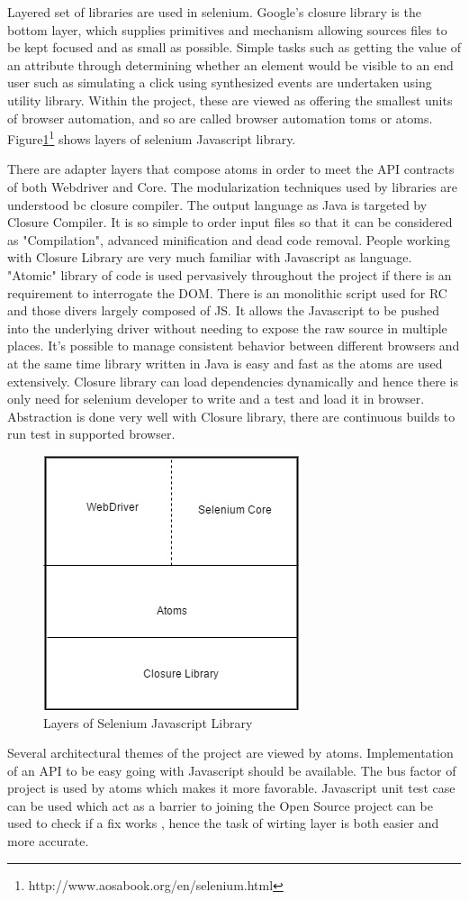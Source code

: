 \documentclass[article,type=msc,colorback,accentcolor=tud9c,twoside,11pt]{tudthesis}
\begin{document}
Layered set of libraries are used in selenium. Google's closure library is the bottom layer, which supplies primitives and mechanism allowing sources files to be kept focused and as small as possible. Simple tasks such as getting the value of an attribute through determining whether an element would be visible to an end user such as simulating a click using synthesized events are undertaken using utility library. Within the project, these are viewed as offering the smallest units of browser automation, and so are called browser automation toms or atoms. 
 Figure\ref{fig:LayersofSeleniumJSLibrary}\footnote{http://www.aosabook.org/en/selenium.html} shows layers of selenium Javascript library.

There are adapter layers that compose atoms in order to meet the API contracts of both Webdriver and Core. The modularization techniques used by libraries are understood bc closure compiler. The output language as Java is targeted by Closure Compiler. It is so simple to order input files so that it can be considered as "Compilation", advanced minification and dead code removal. People working with Closure Library are very much familiar with Javascript as language. "Atomic" library of code is used pervasively throughout the project if there is an requirement to interrogate the DOM. There is an monolithic script used for RC and those divers largely composed of JS. It allows the Javascript to be pushed into the underlying driver without needing to expose the raw source in multiple places. It's possible to manage consistent behavior between different browsers and at the same time library written in Java is easy and fast as the atoms are used extensively. Closure library can load dependencies dynamically and hence there is only need for selenium developer to write and a test and load it in browser. Abstraction is done very well with Closure library, there are continuous builds to run test in supported browser.
\begin{figure}[h]
	\centering
	\includegraphics[scale=0.6]{LayersofSeleniumJSLibrary}
	\caption{Layers of Selenium Javascript Library}
	\label{fig:LayersofSeleniumJSLibrary}
\end{figure}
Several architectural themes of the project are viewed by atoms. Implementation of an API to be easy going with Javascript should be available. The bus factor of project is used by atoms which makes it more favorable. Javascript unit test case can be used which act as a barrier to joining the Open Source project can be used to check if a fix works , hence the task of wirting layer is both easier and more accurate.
\end{document}
